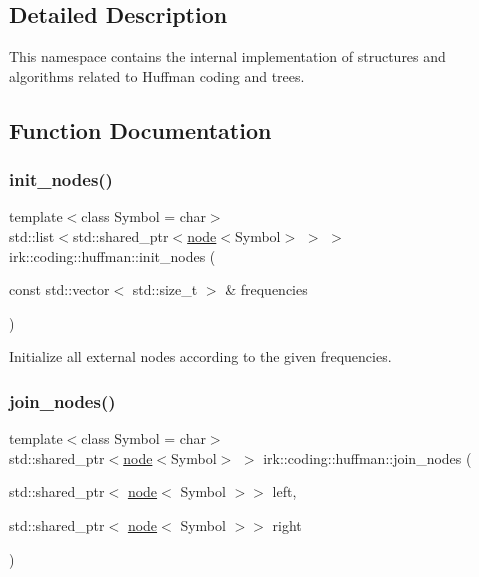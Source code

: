 \subsection{Detailed Description}
This namespace contains the internal implementation of structures and algorithms related to Huffman coding and trees. 

\subsection{Function Documentation}
\mbox{\label{namespaceirk_1_1coding_1_1huffman_abbb62b84b6667cc6ed6000f36a52414c}} 
\subsubsection{\texorpdfstring{init\+\_\+nodes()}{init\_nodes()}}
{\footnotesize\ttfamily template$<$class Symbol  = char$>$ \\
std\+::list$<$std\+::shared\+\_\+ptr$<$\mbox{\hyperlink{structirk_1_1coding_1_1huffman_1_1node}{node}}$<$Symbol$>$ $>$ $>$ irk\+::coding\+::huffman\+::init\+\_\+nodes (\begin{DoxyParamCaption}\item[{const std\+::vector$<$ std\+::size\+\_\+t $>$ \&}]{frequencies }\end{DoxyParamCaption})}



Initialize all external nodes according to the given frequencies. 

\mbox{\label{namespaceirk_1_1coding_1_1huffman_ac5ed25bf8ec1c076d2905f59e3930502}} 
\subsubsection{\texorpdfstring{join\+\_\+nodes()}{join\_nodes()}}
{\footnotesize\ttfamily template$<$class Symbol  = char$>$ \\
std\+::shared\+\_\+ptr$<$\mbox{\hyperlink{structirk_1_1coding_1_1huffman_1_1node}{node}}$<$Symbol$>$ $>$ irk\+::coding\+::huffman\+::join\+\_\+nodes (\begin{DoxyParamCaption}\item[{std\+::shared\+\_\+ptr$<$ \mbox{\hyperlink{structirk_1_1coding_1_1huffman_1_1node}{node}}$<$ Symbol $>$$>$}]{left,  }\item[{std\+::shared\+\_\+ptr$<$ \mbox{\hyperlink{structirk_1_1coding_1_1huffman_1_1node}{node}}$<$ Symbol $>$$>$}]{right }\end{DoxyParamCaption})}



